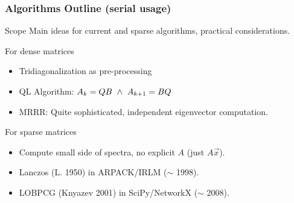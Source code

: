  \begin{frame}
  \frametitle{Algorithms Outline (serial usage)}
  \begin{block}{Scope}
    Main ideas for current and sparse algorithms, practical
    considerations. 
  \end{block}
  \begin{block}{For dense matrices}
    \begin{itemize}
      \item Tridiagonalization as pre-processing
      \item QL Algorithm: $A_k = QB \,\,\land\,\, A_{k+1} = B Q$
      \item MRRR: Quite sophisticated, independent eigenvector computation.
    \end{itemize}
  \end{block}
  \begin{block}{For sparse matrices}
    \begin{itemize}
      \item Compute small side of spectra, no explicit $A$ (just $A\vec{x}$).
    \item Lanczos (L. 1950) in ARPACK/IRLM ($\sim$ 1998).
    \item LOBPCG (Knyazev 2001) in SciPy/NetworkX ($\sim$ 2008).
    \end{itemize}
  \end{block}
\end{frame}
